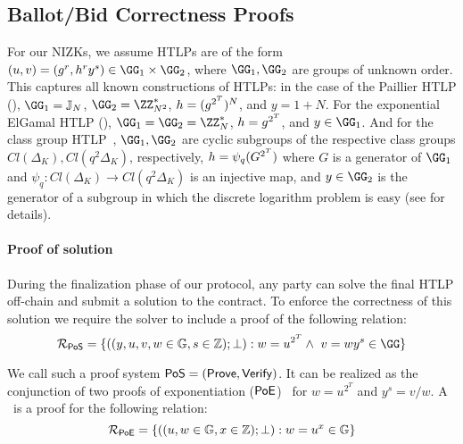 \subsection{Ballot/Bid Correctness Proofs}\label{sec:sigmas}

For our NIZKs, we assume HTLPs are of the form $(u,v) = (g^r, h^r y^s) \in \GG_1 \times \GG_2$, where $\GG_1, \GG_2$ are groups of unknown order. 
This captures all known constructions of HTLPs: in the case of the Paillier HTLP (), $\GG_1 = \mathbb{J}_N$, $\GG_2 = \ZZ_{N^2}^*$, $h = (g^{2^{T}})^N$, and $y = 1+N$. For the exponential ElGamal HTLP (), $\GG_1 = \GG_2 = \ZZ_N^*$, $h = g^{2^{T}}$, and $y \in \GG_1$. And for the class group HTLP~\cite{CCS:TCLM21}, $\GG_1,\GG_2$ are cyclic subgroups of the respective class groups $Cl(\Delta_K), Cl(q^2\Delta_K)$, respectively, $h = \psi_q(G^{2^{T}})$ where $G$ is a generator of $\GG_1$ and $\psi_q : Cl(\Delta_K) \to Cl(q^2 \Delta_K)$ is an injective map, and $y \in \GG_2$ is the generator of a subgroup in which the discrete logarithm problem is easy (see \cite{CCS:TCLM21} for details).

\paragraph{Proof of solution}


% 

During the finalization phase of our protocol, any party can solve the final HTLP off-chain and submit a solution to the contract. To enforce the correctness of this solution we require the solver to include a proof of the following relation:
\begin{equation}
    \mathcal{R}_{\pos}=\{((y,u,v,w\in\mathbb{G},s\in\mathbb{Z});\bot): w = u^{2^\timeT} \land\ v = w y^s \in \GG\}
\end{equation}

We call such a proof system ${\sf PoS} = (\mathsf{Prove}, \mathsf{Verify})$. It can be realized as the conjunction of two proofs of exponentiation ($\mathsf{PoE}$)~\cite{ITCS:Pietrzak19b,EC:Wesolowski19} for $w = u^{2^T}$ and $y^s = v/w$.
A \poe\ is a proof for the following relation:
\[
    \mathcal{R}_{\mathsf{PoE}}=\{((u,w\in\mathbb{G},x\in\mathbb{Z});\bot):w=u^{x}\in\mathbb{G}\}
\]

